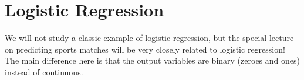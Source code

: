 \section{Logistic Regression}
We will not study a classic example of logistic regression, but the special
lecture on predicting sports matches will be very closely related to logistic
regression! The main difference here is that the output variables are binary
(zeroes and ones) instead of continuous.
